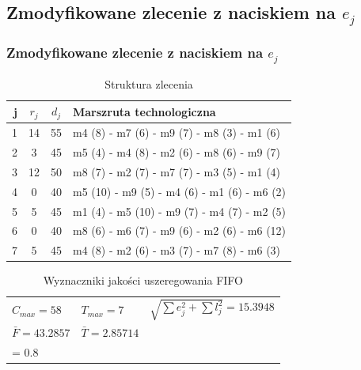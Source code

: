 \documentclass{prezentacja}
\begin{document}
\subsection{Zmodyfikowane zlecenie z naciskiem na $e_j$ }
\label{sec:z4}
\begin{frame}
    \frametitle{Zmodyfikowane zlecenie z naciskiem na $e_j$ }
    \begin{table}[htb]
		\centering
		\caption{\large Struktura zlecenia}
		\scriptsize
		\begin{tabular}{ | r | c | c | l | }
		\hline
		j	& \(r_j\)	& \(d_j\)	& Marszruta technologiczna	\\ \hline
		\rowcolor{lightYellow}
		1	& 14	& 55	& m4 (8) - m7 (6) - m9 (7) - m8 (3) - m1 (6)	\\ \hline
		\rowcolor{lightYellow}
		2	& 3	& 45	& m5 (4) - m4 (8) - m2 (6) - m8 (6) - m9 (7)	\\ \hline
		\rowcolor{lightYellow}
		3	& 12	& 50	& m8 (7) - m2 (7) - m7 (7) - m3 (5) - m1 (4)	\\ \hline
		4	& 0	& 40	& m5 (10) - m9 (5) - m4 (6) - m1 (6) - m6 (2)	\\ \hline
		5	& 5	& 45	& m1 (4) - m5 (10) - m9 (7) - m4 (7) - m2 (5)	\\ \hline
		6	& 0	& 40	& m8 (6) - m6 (7) - m9 (6) - m2 (6) - m6 (12)	\\ \hline
		7	& 5	& 45	& m4 (8) - m2 (6) - m3 (7) - m7 (8) - m6 (3)	\\ \hline
		\end{tabular}
	\end{table}    
    \begin{table}[htb]
        \caption{\large Wyznaczniki jakości uszeregowania FIFO}
        \scriptsize
        \centering
        \begin{tabular}{ l l l }
		\(C_{max} = 58 \)	& \( T_{max} = 7 \)	& \( \sqrt{\sum e_j^2 + \sum l_j^2} = 15.3948\)	\\
		\( \bar{F} = 43.2857 \)	& \( \bar{T} = 2.85714 \)	& \( \alpha*\sum e_j + \beta*\sum l_j \Big|_{\substack{\alpha = 0.2\\ \beta = 0.8}} = 19.4 \)	\\ 
        \end{tabular}
    \end{table}
\end{frame}
\end{document}
